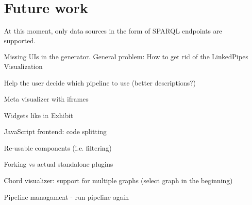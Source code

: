 \chapter{Future work}

At this moment, only data sources in the form of SPARQL endpoints are supported.

Missing UIs in the generator. General problem: How to get rid of the LinkedPipes Visualization

Help the user decide which pipeline to use (better descriptions?)

Meta visualizer with iframes

Widgets like in Exhibit

JavaScript frontend: code splitting

Re-usable components (i.e. filtering)

Forking vs actual standalone plugins

Chord visualizer: support for multiple graphs (select graph in the beginning)

Pipeline managament - run pipeline again